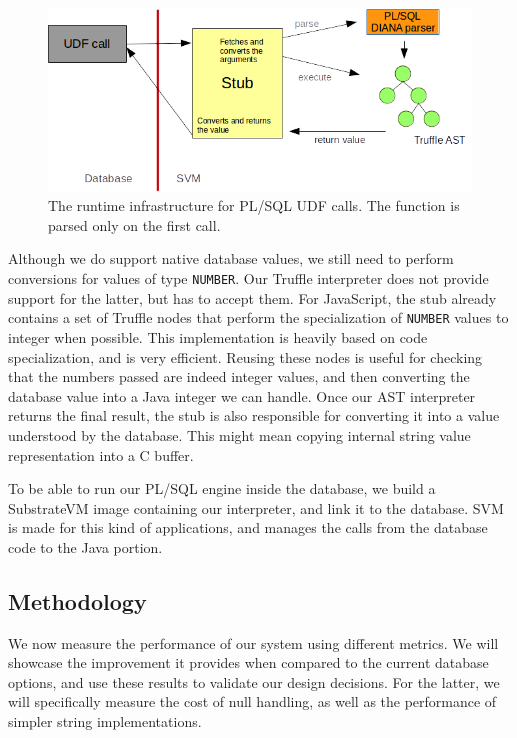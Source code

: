 \documentclass[twoside,11pt,a4paper]{article}
\newcommand{\pls}[1]{\small\texttt{#1}\normalsize}
\newcommand{\plstype}[1]{\pls{#1}}
\newcommand{\oranum}{\plstype{NUMBER}}
\begin{document}
\begin{figure}
	\centering
	\includegraphics[width=13cm]{./graphs/StubGraph.png}
	\caption[The runtime infrastructure for PL/SQL UDF calls]{The runtime infrastructure for PL/SQL UDF calls. The function is parsed only on the first call.}
\end{figure}

Although we do support native database values, we still need to perform conversions for values of type \oranum{}. Our Truffle interpreter does not provide support for the latter, but has to accept them. For JavaScript, the stub already contains a set of Truffle nodes that perform the specialization of \oranum{} values to integer when possible. This implementation is heavily based on code specialization, and is very efficient. Reusing these nodes is useful for checking that the numbers passed are indeed integer values, and then converting the database value into a Java integer we can handle. Once our AST interpreter returns the final result, the stub is also responsible for converting it into a value understood by the database. This might mean copying internal string value representation into a C buffer.

To be able to run our PL/SQL engine inside the database, we build a SubstrateVM image containing our interpreter, and link it to the database. SVM is made for this kind of applications, and manages the calls from the database code to the Java portion.

\subsection{Methodology}


We now measure the performance of our system using different metrics. We will showcase the improvement it provides when compared to the current database options, and use these results to validate our design decisions. For the latter, we will specifically measure the cost of null handling, as well as the performance of simpler string implementations.
\end{document}
